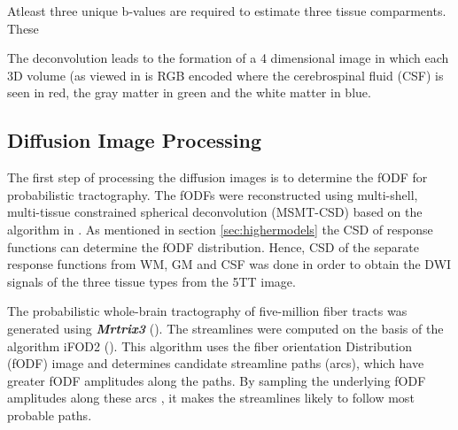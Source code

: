 \documentclass[msthesis.tex]{subfiles}
\begin{document}
Atleast three unique b-values are required to estimate three tissue comparments. These 

The deconvolution leads to the formation of a 4 dimensional image in which each 3D volume (as viewed in  is RGB encoded where the cerebrospinal fluid (CSF) is seen in red, the gray matter in green and the white matter in blue. 
\fi

\subsection{Diffusion Image Processing}

The first step of processing the diffusion images is to determine the fODF for probabilistic tractography. The fODFs were reconstructed using multi-shell, multi-tissue constrained spherical deconvolution (MSMT-CSD) based on the algorithm in \cite{jeurissen2014multi}. As mentioned in section \ref{sec:highermodels} the CSD of response functions can determine the fODF distribution. Hence, CSD of the separate response functions from WM, GM and CSF was done in order to obtain the DWI signals of the three tissue types from the 5TT image.

The probabilistic whole-brain tractography of five-million fiber tracts was generated using \textbf{\textit{Mrtrix3}} (\cite{tournier2019mrtrix3}). The streamlines were computed on the basis of the algorithm iFOD2 (\cite{tournier2010improved}). This algorithm uses the fiber orientation Distribution (fODF) image and determines candidate streamline paths (arcs), which have greater fODF amplitudes along the paths. By sampling the underlying fODF amplitudes along these arcs , it makes the streamlines likely to follow most probable paths.
\end{document}
